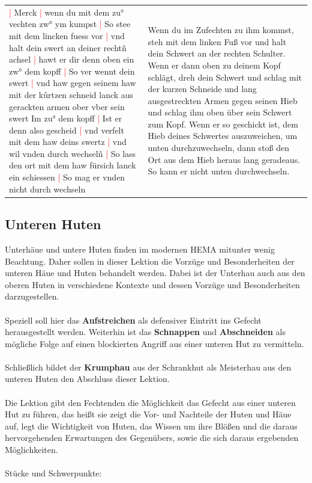 \begin{longtable}{p{6.25cm}p{6.25cm}}
    \textcolor{red}{|} Merck
    \textcolor{red}{|} wenn du mit dem zu° vechten zw° ym kumpst
    \textcolor{red}{|} So stee mit dem lincken fuess vor
    \textcolor{red}{|} vnd halt dein swert an deiner rechtñ achsel
    \textcolor{red}{|} hawt er dir denn oben ein zw° dem kopff
    \textcolor{red}{|} So ver wennt dein swert
    \textcolor{red}{|} vnd haw gegen seinem haw mit der kûrtzen schneid lanck aus gerackten armen ober vber sein swert Im zu° dem kopff
    \textcolor{red}{|} Ist er denn also gescheid
    \textcolor{red}{|} vnd verfelt mit dem haw deins swertz
    \textcolor{red}{|} vnd wil vnden durch wechselñ
    \textcolor{red}{|} So lass den ort mit dem haw fürsich lanck ein schiessen
    \textcolor{red}{|} So mag er vnden nicht durch wechseln
    &
    Wenn du im Zufechten zu ihm kommst, steh mit dem linken Fuß vor und halt dein Schwert an der rechten Schulter.
    Wenn er dann oben zu deinem Kopf schlägt, dreh dein Schwert und schlag mit der kurzen Schneide und lang ausgestreckten Armen gegen seinen Hieb und schlag ihm oben über sein Schwert zum Kopf.
    Wenn er so geschickt ist, dem Hieb deines Schwertes auszuweichen, um unten durchzuwechseln, dann stoß den Ort aus dem Hieb heraus lang geradeaus.
    So kann er nicht unten durchwechseln.
\end{longtable}

\newpage

\begin{center}
\end{center}

\newpage

\subsection{Unteren Huten}
\label{sec:untere_huten}

Unterhäue und untere Huten finden im modernen HEMA mitunter wenig Beachtung.
Daher sollen in dieser Lektion die Vorzüge und Besonderheiten der unteren Häue und Huten behandelt werden.
Dabei ist der Unterhau auch aus den oberen Huten in verschiedene Kontexte und dessen Vorzüge und Besonderheiten darzugestellen.
\\
\\
Speziell soll hier das \textbf{Aufstreichen} als defensiver Eintritt ins Gefecht herausgestellt werden.
Weiterhin ist das \textbf{Schnappen} und \textbf{Abschneiden} als mögliche Folge auf einen blockierten Angriff aus einer unteren Hut zu vermitteln.
\\
\\
Schließlich bildet der \textbf{Krumphau} aus der Schrankhut als Meisterhau aus den unteren Huten den Abschluss dieser Lektion.
\\
\\
Die Lektion gibt den Fechtenden die Möglichkeit das Gefecht aus einer unteren Hut zu führen, das heißt sie zeigt die Vor- und Nachteile der Huten und Häue auf, legt die Wichtigkeit von Huten, das Wissen um ihre Blößen und die daraus hervorgehenden Erwartungen des Gegenübers, sowie die sich daraus ergebenden Möglichkeiten.
\\
\\
Stücke und Schwerpunkte:

